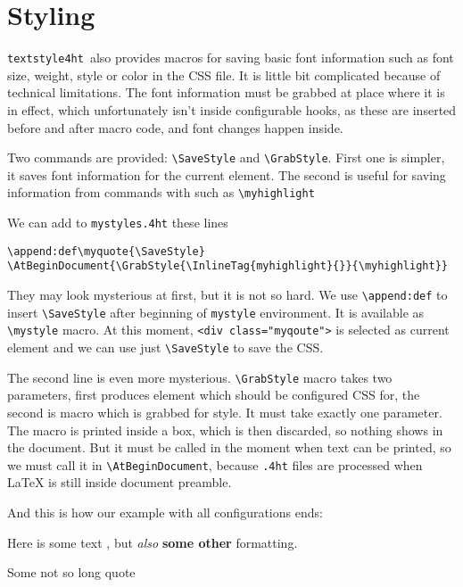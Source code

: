\documentclass{article}
\newcommand\ts{\texttt{textstyle4ht}\ }
\begin{document}
\section{Styling}

\ts also provides macros for saving basic font information such as font size,
weight, style or color in the CSS file. It is little bit complicated because of
technical limitations. The font information must be grabbed at place where it
is in effect, which unfortunately isn't inside configurable hooks, as these are
inserted before and after macro code, and font changes happen inside. 

Two commands are provided: \verb|\SaveStyle| and \verb|\GrabStyle|. First one
is simpler, it saves font information for the current element. The second is
useful for saving information from commands with such as \verb|\myhighlight|

We can add to \texttt{mystyles.4ht} these lines

\begin{verbatim}
\append:def\myquote{\SaveStyle}
\AtBeginDocument{\GrabStyle{\InlineTag{myhighlight}{}}{\myhighlight}}
\end{verbatim}

They may look mysterious at first, but it is not so hard. We use
\verb|\append:def| to insert \verb|\SaveStyle| after beginning of
\texttt{mystyle} environment. It is available as \verb|\mystyle| macro. At this
moment, \texttt{<div class="myqoute">} is selected as current element and we
can use just \verb|\SaveStyle| to save the CSS.

The second line is even more mysterious. \verb|\GrabStyle| macro takes two
parameters, first produces element which should be configured CSS for, the
second is macro which is grabbed for style. It must take exactly one parameter.
The macro is printed inside a box, which is then discarded, so nothing shows in
the document. But it must be called in the moment when text can be printed, so
we must call it in \verb|\AtBeginDocument|, because \texttt{.4ht} files are
processed when LaTeX is still inside document preamble.


And this is how our example with all configurations ends:


Here is some text , but \textit{also} \textbf{some
  other} formatting. 

\begin{myquote}
Some not so long quote
\end{myquote}
\end{document}

